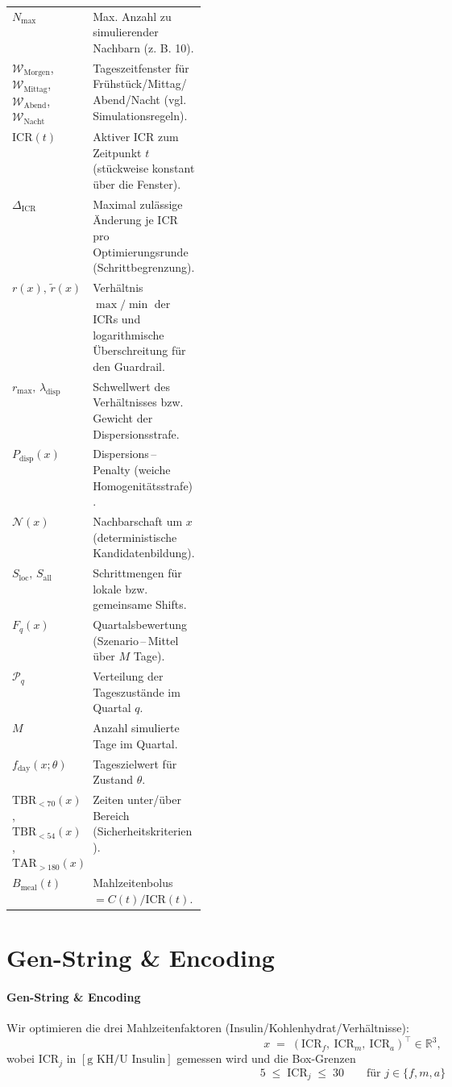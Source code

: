 \documentclass[ngerman,a4paper,12pt,pdftex]{article}
\newcommand{\ICR}{\mathrm{ICR}}
\newcommand{\ICRf}{\mathrm{ICR}_f}
\newcommand{\ICRm}{\mathrm{ICR}_m}
\newcommand{\ICRa}{\mathrm{ICR}_a}
\newcommand{\DICR}{\Delta_{\mathrm{ICR}}}
\newcommand{\rmax}{r_{\max}}
\newcommand{\lambdadisp}{\lambda_{\mathrm{disp}}}
\newcommand{\IKRtxtpl}{Insulin\-/Kohlenhydrat\-/Ver\-h\"altnis\-se}
\begin{document}
\begin{table}[p]
\begin{tabularx}{\linewidth}{@{}>{\raggedright\arraybackslash}p{0.28\linewidth}X@{}}
\(N_{\max}\)                  & Max. Anzahl zu simulierender Nachbarn (z. B. 10). \\
$\mathcal W_{\mathrm{Morgen}}$, $\mathcal W_{\mathrm{Mittag}}$, $\mathcal W_{\mathrm{Abend}}$, $\mathcal W_{\mathrm{Nacht}}$ & Tageszeitfenster f\"ur Fr\"uhst\"uck/Mittag/Abend/Nacht (vgl. Simulationsregeln). \\
$\ICR(t)$                  & Aktiver ICR zum Zeitpunkt $t$ (st\"uckweise konstant \"uber die Fenster). \\
$\DICR$                    & Maximal zul\"assige \"Anderung je ICR pro Optimierungsrunde (Schrittbegrenzung). \\
$r(x),\,\tilde r(x)$      & Verh\"altnis $\max/\min$ der ICRs und logarithmische \"Uberschreitung f\"ur den Guardrail. \\
$\rmax,\,\lambdadisp$    & Schwellwert des Verh\"altnisses bzw. Gewicht der Dispersionsstrafe. \\
$P_{\mathrm{disp}}(x)$    & Dispersions\,–\,Penalty (weiche Homogenit\"atsstrafe). \\
$\mathcal N(x)$           & Nachbarschaft um $x$ (deterministische Kandidatenbildung). \\
$S_{\text{loc}},\,S_{\text{all}}$ & Schrittmengen f\"ur lokale bzw. gemeinsame Shifts. \\
$F_q(x)$                  & Quartalsbewertung (Szenario\,–\,Mittel \"uber $M$ Tage). \\
$\mathcal P_q$            & Verteilung der Tageszust\"ande im Quartal $q$. \\
$M$                       & Anzahl simulierte Tage im Quartal. \\
$f_{\text{day}}(x;\theta)$ & Tageszielwert f\"ur Zustand $\theta$. \\
$\mathrm{TBR}_{<70}(x)$, $\mathrm{TBR}_{<54}(x)$, $\mathrm{TAR}_{>180}(x)$ & Zeiten unter/\"uber Bereich (Sicherheitskriterien). \\
$B_{\mathrm{meal}}(t)$   & Mahlzeitenbolus $=C(t)/\ICR(t)$. \\
\hline
\end{tabularx}
\end{table}
\FloatBarrier

\section{Gen-String \& Encoding}

\paragraph{Gen-String \& Encoding}
Wir optimieren die drei Mahlzeitenfaktoren (\IKRtxtpl):
\[
x \;=\; (\ICRf,\ \ICRm,\ \ICRa)^\top \in \mathbb{R}^3,
\]
wobei \(\mathrm{ICR}_j\) in \([\text{g KH} / \text{U Insulin}]\) gemessen wird und die Box-Grenzen
\[
5 \;\le\; \mathrm{ICR}_j \;\le\; 30 \qquad \text{für } j \in \{f,m,a\}
\]
\end{document}
